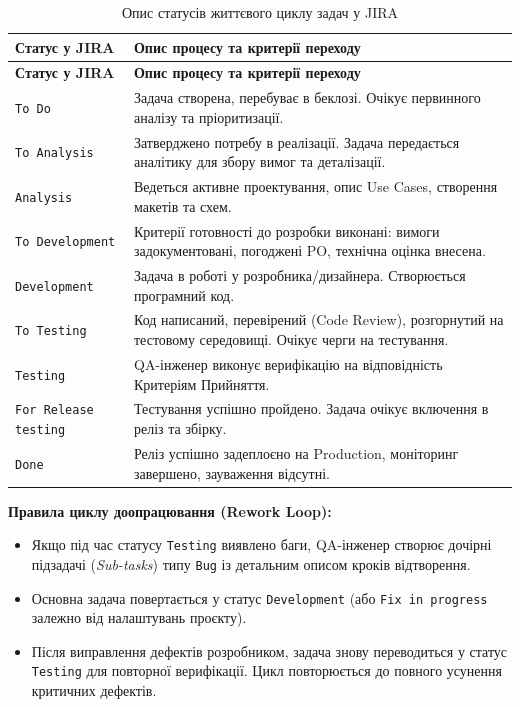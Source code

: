 \documentclass{article}
\begin{document}
\begin{longtable}{@{}p{3.5cm}p{10.7cm}@{}}
\caption{Опис статусів життєвого циклу задач у JIRA} \label{tab:workflow} \\
\toprule
\textbf{Статус у JIRA} & \textbf{Опис процесу та критерії переходу} \\
\midrule
\endfirsthead
\toprule
\textbf{Статус у JIRA} & \textbf{Опис процесу та критерії переходу} \\
\midrule
\endhead
\bottomrule
\endfoot
\bottomrule
\endlastfoot
\texttt{To Do} & Задача створена, перебуває в беклозі. Очікує первинного аналізу та пріоритизації. \\
\texttt{To Analysis} & Затверджено потребу в реалізації. Задача передається аналітику для збору вимог та деталізації. \\
\texttt{Analysis} & Ведеться активне проектування, опис Use Cases, створення макетів та схем. \\
\texttt{To Development} & Критерії готовності до розробки виконані: вимоги задокументовані, погоджені PO, технічна оцінка внесена. \\
\texttt{Development} & Задача в роботі у розробника/дизайнера. Створюється програмний код. \\
\texttt{To Testing} & Код написаний, перевірений (Code Review), розгорнутий на тестовому середовищі. Очікує черги на тестування. \\
\texttt{Testing} & QA-інженер виконує верифікацію на відповідність Критеріям Прийняття. \\
\texttt{For Release testing} & Тестування успішно пройдено. Задача очікує включення в реліз та збірку. \\
\texttt{Done} & Реліз успішно задеплоєно на Production, моніторинг завершено, зауваження відсутні. \\
\end{longtable}

\textbf{Правила циклу доопрацювання (Rework Loop):}
\begin{itemize}
    \item Якщо під час статусу \texttt{Testing} виявлено баги, QA-інженер створює дочірні підзадачі (\emph{Sub-tasks}) типу \texttt{Bug} із детальним описом кроків відтворення.
    \item Основна задача повертається у статус \texttt{Development} (або \texttt{Fix in progress} залежно від налаштувань проєкту).
    \item Після виправлення дефектів розробником, задача знову переводиться у статус \texttt{Testing} для повторної верифікації. Цикл повторюється до повного усунення критичних дефектів.
\end{itemize}
\end{document}
